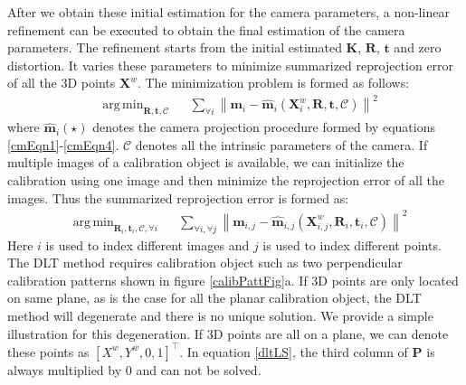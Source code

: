\documentclass{report}
\DeclareMathOperator*{\argmin}{arg\,min}
\begin{document}
After we obtain these initial estimation for the camera parameters, a non-linear refinement can be executed to obtain the final estimation of the camera parameters. The refinement starts from the initial estimated $\mathbf{K}$, $\mathbf{R}$, $\mathbf{t}$ and zero distortion. It varies these parameters to minimize summarized reprojection error of all the 3D points $\mathbf{X}^w$. The minimization problem is formed as follows: 
\begin{equation}
\begin{aligned}
& \argmin_{\mathbf{R}, \mathbf{t}, \mathcal{C}} & & \sum_{\forall i} \left \| \mathbf{m}_i - \hat{\mathbf{m}}_i(\mathbf{X}^w_i, \mathbf{R}, \mathbf{t}, \mathcal{C}) \right \|^2
\end{aligned}
\label{dltOptEqn}
\end{equation}
where $\hat{\mathbf{m}}_i(\star)$ denotes the camera projection procedure formed by equations \ref{cmEqn1}-\ref{cmEqn4}. $\mathcal{C}$ denotes all the intrinsic parameters of the camera. If multiple images of a calibration object is available, we can initialize the calibration using one image and then minimize the reprojection error of all the images. Thus the summarized reprojection error is formed as: 
\begin{equation}
\begin{aligned}
& \argmin_{\mathbf{R}_i, \mathbf{t}_i, \mathcal{C}, \forall i} & & \sum_{\forall i, \forall j} \left \| \mathbf{m}_{i, j} - \hat{\mathbf{m}}_{i, j}(\mathbf{X}^w_{i, j}, \mathbf{R}_i, \mathbf{t}_i, \mathcal{C}) \right \|^2
\end{aligned}
\label{dltAllOptEqn}
\end{equation}
Here $i$ is used to index different images and $j$ is used to index different points. The DLT method requires calibration object such as two perpendicular calibration patterns shown in figure \ref{calibPattFig}a. If 3D points are only located on same plane, as is the case for all the planar calibration object, the DLT method will degenerate and there is no unique solution. We provide a simple illustration for this degeneration. If 3D points are all on a plane, we can denote these points as $[X^w, Y^w, 0, 1]^\top$. In equation \ref{dltLS}, the third column of $\mathbf{P}$ is always multiplied by 0 and can not be solved. 
\end{document}
